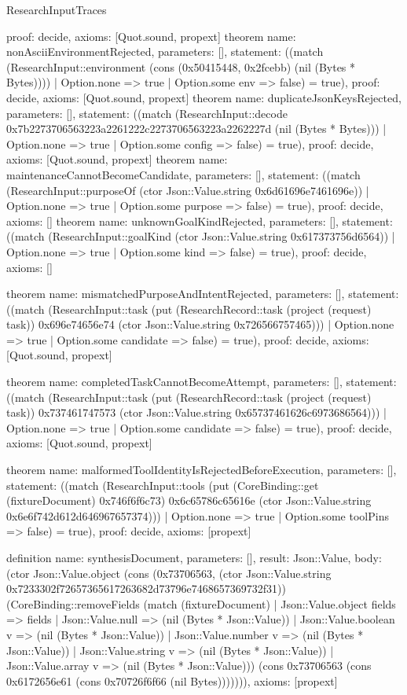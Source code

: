\begin{lexlean}{ResearchInputTraces}
\begin{semanticmodule}
{ proof: decide{},
 axioms: [Quot.sound, propext]
}
theorem{
 name: nonAsciiEnvironmentRejected,
 parameters: [],
 statement: ((match (ResearchInput::environment (cons (0x50415448, 0x2fcebb) (nil (Bytes * Bytes)))) | Option.none => true | Option.some env => false) = true),
 proof: decide{},
 axioms: [Quot.sound, propext]
}
theorem{
 name: duplicateJsonKeysRejected,
 parameters: [],
 statement: ((match (ResearchInput::decode 0x7b2273706563223a2261222c2273706563223a2262227d (nil (Bytes * Bytes))) | Option.none => true | Option.some config => false) = true),
 proof: decide{},
 axioms: [Quot.sound, propext]
}
theorem{
 name: maintenanceCannotBecomeCandidate,
 parameters: [],
 statement: ((match (ResearchInput::purposeOf (ctor Json::Value.string 0x6d61696e7461696e)) | Option.none => true | Option.some purpose => false) = true),
 proof: decide{},
 axioms: []
}
theorem{
 name: unknownGoalKindRejected,
 parameters: [],
 statement: ((match (ResearchInput::goalKind (ctor Json::Value.string 0x617373756d6564)) | Option.none => true | Option.some kind => false) = true),
 proof: decide{},
 axioms: []
}

theorem{
 name: mismatchedPurposeAndIntentRejected,
 parameters: [],
 statement: ((match (ResearchInput::task (put (ResearchRecord::task (project (request) task)) 0x696e74656e74 (ctor Json::Value.string 0x726566757465))) | Option.none => true | Option.some candidate => false) = true),
 proof: decide{},
 axioms: [Quot.sound, propext]
}

theorem{
 name: completedTaskCannotBecomeAttempt,
 parameters: [],
 statement: ((match (ResearchInput::task (put (ResearchRecord::task (project (request) task)) 0x737461747573 (ctor Json::Value.string 0x65737461626c6973686564))) | Option.none => true | Option.some candidate => false) = true),
 proof: decide{},
 axioms: [Quot.sound, propext]
}


theorem{
 name: malformedToolIdentityIsRejectedBeforeExecution,
 parameters: [],
 statement: ((match (ResearchInput::tools (put (CoreBinding::get (fixtureDocument) 0x746f6f6c73) 0x6c65786c65616e (ctor Json::Value.string 0x6e6f742d612d646967657374))) | Option.none => true | Option.some toolPins => false) = true),
 proof: decide{},
 axioms: [propext]
}


definition{
 name: synthesisDocument,
 parameters: [],
 result: Json::Value,
 body: (ctor Json::Value.object (cons (0x73706563, (ctor Json::Value.string 0x7233302f72657365617263682d73796e7468657369732f31)) (CoreBinding::removeFields (match (fixtureDocument) | Json::Value.object fields => fields | Json::Value.null => (nil (Bytes * Json::Value)) | Json::Value.boolean v => (nil (Bytes * Json::Value)) | Json::Value.number v => (nil (Bytes * Json::Value)) | Json::Value.string v => (nil (Bytes * Json::Value)) | Json::Value.array v => (nil (Bytes * Json::Value))) (cons 0x73706563 (cons 0x6172656e61 (cons 0x70726f6f66 (nil Bytes))))))),
 axioms: [propext]
}


\end{semanticmodule}
\end{lexlean}
